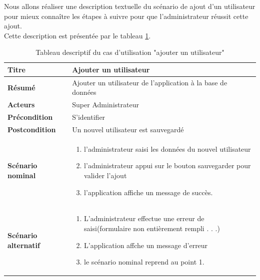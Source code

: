 \documentclass{article}
\begin{document}
Nous allons réaliser une description textuelle du scénario de ajout d'un utilisateur
pour mieux connaître les étapes à suivre pour que l'administrateur réussit cette ajout.\\
Cette description est présentée par le tableau \ref{tab:tab5}.
\begin{table}[H]
\centering
 \begin{tabularx}{\textwidth}{|X|X|}
\hline
 \textbf{Titre} & \textbf{Ajouter un utilisateur} \\ \hline
\textbf{Résumé} & Ajouter un utilisateur de l'application à la base de données \\
\hline
\textbf{Acteurs} & Super Administrateur\\
\hline
\textbf{Précondition} & S'identifier \\
\hline
\textbf{Postcondition} & Un nouvel utilisateur est sauvegardé \\
\hline
\textbf{Scénario nominal} & \begin{enumerate}
\item l'administrateur saisi les données du nouvel utilisateur
\item l'administrateur appui sur le bouton sauvegarder pour
valider l'ajout
\item l'application affiche un message de succès.
\end{enumerate} \\
\hline
\textbf{Scénario alternatif} & \begin{enumerate}
\item L'administrateur effectue une erreur de saisi(formulaire non entièrement rempli . . .)
\item L'application affche un message d'erreur
\item le scénario nominal reprend au point 1.
\end{enumerate} \\
\hline
\end{tabularx}
\caption[tableau 5 : Tableau descriptif du cas d'utilisation "ajouter un utilisateur"]{Tableau descriptif du cas d'utilisation "ajouter un utilisateur"}
\label{tab:tab5}
\end{table}
\end{document}
